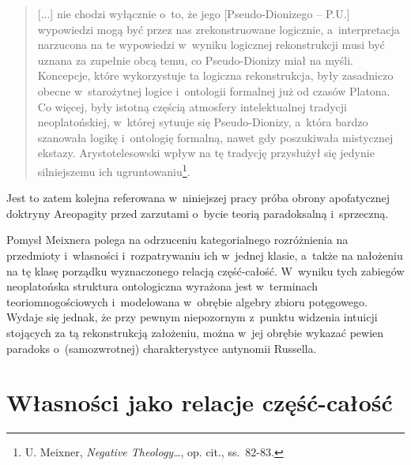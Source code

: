 \begin{quote}
[...] nie chodzi wyłącznie o~to, że jego [Pseudo-Dionizego -- P.U.] wypowiedzi mogą być przez nas zrekonstruowane logicznie, a~interpretacja narzucona na te wypowiedzi w~wyniku logicznej rekonstrukcji musi być uznana za zupełnie obcą temu, co Pseudo-Dionizy miał na myśli. Koncepcje, które wykorzystuje ta logiczna rekonstrukcja, były zasadniczo obecne w~starożytnej logice i~ontologii formalnej już od czasów Platona. Co więcej, były istotną częścią atmosfery intelektualnej tradycji neoplatońskiej, w~której sytuuje się Pseudo-Dionizy, a~która bardzo szanowała logikę i~ontologię formalną, nawet gdy poszukiwała mistycznej ekstazy. Arystotelesowski wpływ na tę tradycję przysłużył się jedynie silniejszemu ich ugruntowaniu\footnote{U. Meixner, \textit{Negative Theology}\ldots, op. cit., ss.~82-83.}.
\end{quote}
Jest to zatem kolejna referowana w~niniejszej pracy próba obrony apofatycznej doktryny Areopagity przed zarzutami o~bycie teorią paradoksalną i~sprzeczną.

Pomysł Meixnera polega na odrzuceniu kategorialnego rozróżnienia na przedmioty i~własności i~rozpatrywaniu ich w~jednej klasie, a~także na nałożeniu na tę klasę porządku wyznaczonego relacją część-całość. W~wyniku tych zabiegów neoplatońska struktura ontologiczna wyrażona jest w~terminach teoriomnogościowych i~modelowana w~obrębie algebry zbioru potęgowego. Wydaje się jednak, że przy pewnym niepozornym z~punktu widzenia intuicji stojących za tą rekonstrukcją założeniu, można w~jej obrębie wykazać pewien paradoks o~(samozwrotnej) charakterystyce antynomii Russella.

\section{Własności jako relacje część-całość}

